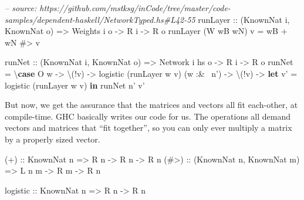 \documentclass[]{article}
\newenvironment{Shaded}{}{}
\newcommand{\KeywordTok}[1]{\textcolor[rgb]{0.00,0.44,0.13}{\textbf{#1}}}
\newcommand{\DataTypeTok}[1]{\textcolor[rgb]{0.56,0.13,0.00}{#1}}
\newcommand{\CommentTok}[1]{\textcolor[rgb]{0.38,0.63,0.69}{\textit{#1}}}
\newcommand{\OtherTok}[1]{\textcolor[rgb]{0.00,0.44,0.13}{#1}}
\newcommand{\FunctionTok}[1]{\textcolor[rgb]{0.02,0.16,0.49}{#1}}
\newcommand{\NormalTok}[1]{#1}
\begin{document}
\begin{Shaded}
\begin{Highlighting}[]
\CommentTok{-- source: https://github.com/mstksg/inCode/tree/master/code-samples/dependent-haskell/NetworkTyped.hs#L42-55}
\OtherTok{runLayer ::}\NormalTok{ (}\DataTypeTok{KnownNat}\NormalTok{ i, }\DataTypeTok{KnownNat}\NormalTok{ o)}
         \OtherTok{=>} \DataTypeTok{Weights}\NormalTok{ i o}
         \OtherTok{->} \DataTypeTok{R}\NormalTok{ i}
         \OtherTok{->} \DataTypeTok{R}\NormalTok{ o}
\NormalTok{runLayer (}\DataTypeTok{W}\NormalTok{ wB wN) v }\FunctionTok{=}\NormalTok{ wB }\FunctionTok{+}\NormalTok{ wN }\FunctionTok{#>}\NormalTok{ v}

\OtherTok{runNet ::}\NormalTok{ (}\DataTypeTok{KnownNat}\NormalTok{ i, }\DataTypeTok{KnownNat}\NormalTok{ o)}
       \OtherTok{=>} \DataTypeTok{Network}\NormalTok{ i hs o}
       \OtherTok{->} \DataTypeTok{R}\NormalTok{ i}
       \OtherTok{->} \DataTypeTok{R}\NormalTok{ o}
\NormalTok{runNet }\FunctionTok{=}\NormalTok{ \textbackslash{}}\KeywordTok{case}
   \DataTypeTok{O}\NormalTok{ w }\OtherTok{->}\NormalTok{ \textbackslash{}(}\FunctionTok{!}\NormalTok{v) }\OtherTok{->}\NormalTok{ logistic (runLayer w v)}
\NormalTok{   (w }\FunctionTok{:&~}\NormalTok{ n') }\OtherTok{->}\NormalTok{ \textbackslash{}(}\FunctionTok{!}\NormalTok{v) }\OtherTok{->} \KeywordTok{let}\NormalTok{ v' }\FunctionTok{=}\NormalTok{ logistic (runLayer w v)}
                          \KeywordTok{in}\NormalTok{ runNet n' v'}
\end{Highlighting}
\end{Shaded}

But now, we get the assurance that the matrices and vectors all fit each-other,
at compile-time. GHC basically writes our code for us. The operations all demand
vectors and matrices that ``fit together'', so you can only ever multiply a
matrix by a properly sized vector.

\begin{Shaded}
\begin{Highlighting}[]
\OtherTok{(+)  ::} \DataTypeTok{KnownNat}\NormalTok{ n}
     \OtherTok{=>} \DataTypeTok{R}\NormalTok{ n }\OtherTok{->} \DataTypeTok{R}\NormalTok{ n }\OtherTok{->} \DataTypeTok{R}\NormalTok{ n}
\OtherTok{(#>) ::}\NormalTok{ (}\DataTypeTok{KnownNat}\NormalTok{ n, }\DataTypeTok{KnownNat}\NormalTok{ m)}
     \OtherTok{=>} \DataTypeTok{L}\NormalTok{ n m }\OtherTok{->} \DataTypeTok{R}\NormalTok{ m }\OtherTok{->} \DataTypeTok{R}\NormalTok{ n}

\OtherTok{logistic ::} \DataTypeTok{KnownNat}\NormalTok{ n}
         \OtherTok{=>} \DataTypeTok{R}\NormalTok{ n }\OtherTok{->} \DataTypeTok{R}\NormalTok{ n}
\end{Highlighting}
\end{Shaded}
\end{document}
